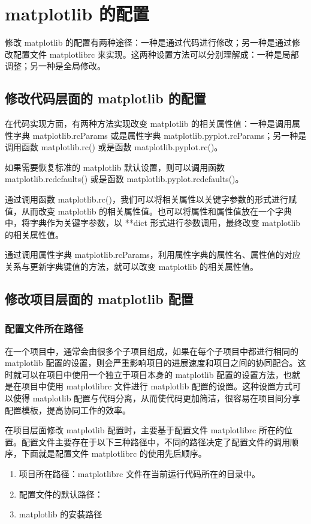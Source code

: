 \chapter{matplotlib 的配置\label{ch10}}
修改 matplotlib 的配置有两种途径：一种是通过代码进行修改；另一种是通过修改配置文件 matplotlibrc 来实现。这两种设置方法可以分别理解成：一种是局部调整；另一种是全局修改。
\section{修改代码层面的 matplotlib 的配置}
在代码实现方面，有两种方法实现改变 matplotlib 的相关属性值：一种是调用属性字典 matplotlib.rcParams 或是属性字典 matplotlib.pyplot.rcParams；另一种是调用函数 matplotlib.rc() 或是函数 matplotlib.pyplot.rc()。

如果需要恢复标准的 matplotlib 默认设置，则可以调用函数 matplotlib.rcdefaults() 或是函数 matplotlib.pyplot.rcdefaults()。

通过调用函数 matplotlib.rc()，我们可以将相关属性以关键字参数的形式进行赋值，从而改变 matplotlib 的相关属性值。也可以将属性和属性值放在一个字典中，将字典作为关键字参数，以 **dict 形式进行参数调用，最终改变 matplotlib 的相关属性值。

通过调用属性字典 matplotlib.rcParams，利用属性字典的属性名、属性值的对应关系与更新字典键值的方法，就可以改变 matplotlib 的相关属性值。

\section{修改项目层面的 matplotlib 配置}
\subsection{配置文件所在路径}
在一个项目中，通常会由很多个子项目组成，如果在每个子项目中都进行相同的 matplotlib 配置的设置，则会严重影响项目的进展速度和项目之间的协同配合。这时就可以在项目中使用一个独立于项目本身的 matplotlib 配置的设置方法，也就是在项目中使用 matplotlibrc 文件进行 matplotlib 配置的设置。这种设置方式可以使得 matplotlib 配置与代码分离，从而使代码更加简洁，很容易在项目间分享配置模板，提高协同工作的效率。

在项目层面修改 matplotlib 配置时，主要基于配置文件 matplotlibrc 所在的位置。配置文件主要存在于以下三种路径中，不同的路径决定了配置文件的调用顺序，下面就是配置文件 matplotlibrc 的使用先后顺序。
\begin{enumerate}
    \item 项目所在路径：matplotlibrc 文件在当前运行代码所在的目录中。
    \item 配置文件的默认路径：
    \item matplotlib 的安装路径
\end{enumerate}

